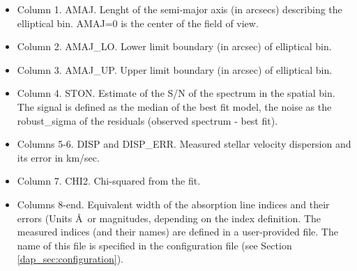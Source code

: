 \begin{itemize}

\item Column 1. AMAJ. Lenght of the semi-major axis (in arcsecs) describing the elliptical bin. AMAJ=0 is the center of the field of view.
\item Column 2. AMAJ\_LO. Lower limit boundary (in arcsec) of elliptical bin.
\item Column 3. AMAJ\_UP. Upper limit boundary (in arcsec) of elliptical bin.
\item Column 4. STON. Estimate of the S/N of the spectrum in the
  spatial bin. The signal is defined as the median of the best fit
  model, the noise as the robust\_sigma of the residuals (observed
  spectrum - best fit).
\item Columns 5-6.  DISP and DISP\_ERR. Measured stellar velocity dispersion and its error in km/sec.
\item Column 7.  CHI2. Chi-squared from the fit.
\item Columns 8-end. Equivalent width of the absorption line indices
  and their errors (Units \AA\ or magnitudes, depending on the index
  definition. The measured indices (and their names) are defined in a
  user-provided file. The name of this file is specified in the
  configuration file (see Section \ref{dap_sec:configuration}).
\end{itemize}
